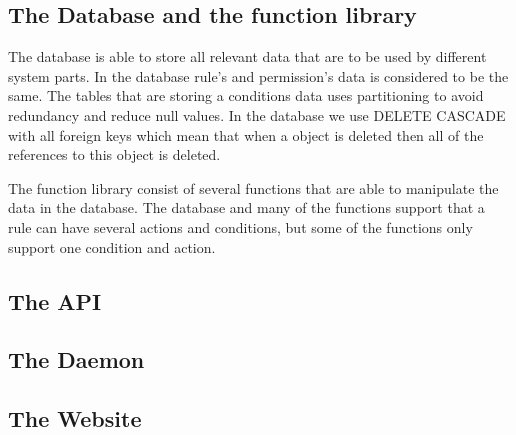 \subsection*{The Database and the function library}
The database is able to store all relevant data that are to be used by different system parts. In the database rule's and permission's data is considered to be the same. The tables that are storing a conditions data uses partitioning to avoid redundancy and reduce null values. In the database we use DELETE CASCADE with all foreign keys which mean that when a object is deleted then all of the references to this object is deleted.

The function library consist of several functions that are able to manipulate the data in the database. The database and many of the functions support that a rule can have several actions and conditions, but some of the functions only support one condition and action.
 
\subsection*{The API}
\subsection*{The Daemon}
\subsection*{The Website}